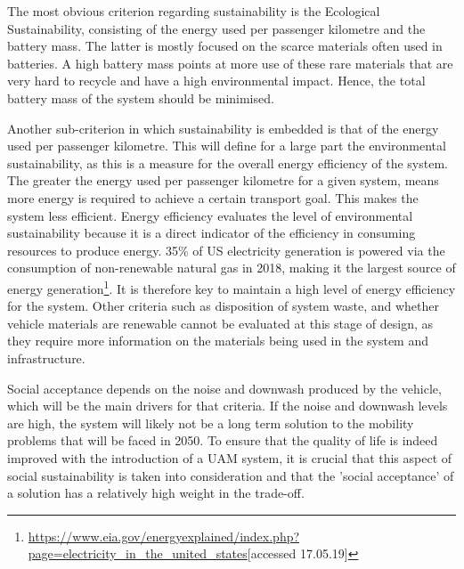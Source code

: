 The most obvious criterion regarding sustainability is the Ecological Sustainability, consisting of the energy used per passenger kilometre and the battery mass. The latter is mostly focused on the scarce materials often used in batteries. A high battery mass points at more use of these rare materials that are very hard to recycle and have a high environmental impact. Hence, the total battery mass of the system should be minimised.

Another sub-criterion in which sustainability is embedded is that of the energy used per passenger kilometre. This will define for a large part the environmental sustainability, as this is a measure for the overall energy efficiency of the system. The greater the energy used per passenger kilometre for a given system, means more energy is required to achieve a certain transport goal. This makes the system less efficient. Energy efficiency evaluates the level of environmental sustainability because it is a direct indicator of the efficiency in consuming resources to produce energy. 35\% of US electricity generation is powered via the consumption of non-renewable natural gas in 2018, making it the largest source of energy generation\footnote{\url{https://www.eia.gov/energyexplained/index.php?page=electricity_in_the_united_states}[accessed 17.05.19]}. It is therefore key to maintain a high level of energy efficiency for the system. Other criteria such as disposition of system waste, and whether vehicle materials are renewable cannot be evaluated at this stage of design, as they require more information on the materials being used in the system and infrastructure. 

Social acceptance depends on the noise and downwash produced by the vehicle, which will be the main drivers for that criteria. If the noise and downwash levels are high, the system will likely not be a long term solution to the mobility problems that will be faced in 2050. To ensure that the quality of life is indeed improved with the introduction of a UAM system, it is crucial that this aspect of social sustainability is taken into consideration and that the 'social acceptance' of a solution has a relatively high weight in the trade-off. 

